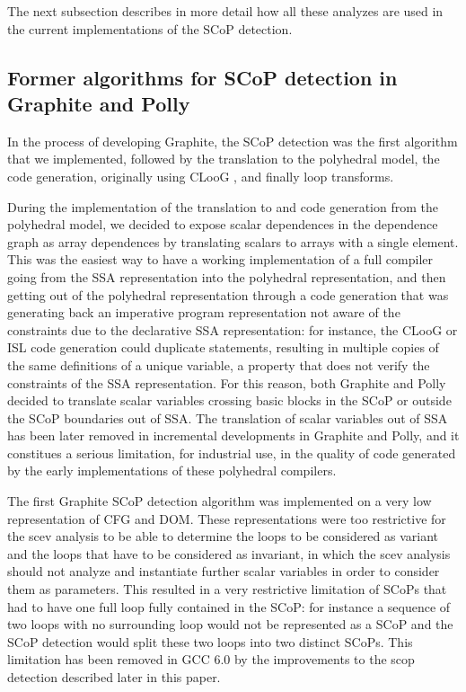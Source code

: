 \documentclass{sigplanconf}
\begin{document}
The next subsection describes in more detail how all these analyzes are used in
the current implementations of the SCoP detection.

\subsection{Former algorithms for SCoP detection in Graphite and Polly}

In the process of developing Graphite, the SCoP detection was the first
algorithm that we implemented, followed by the translation to the polyhedral
model, the code generation, originally using CLooG \cite{cloog}, and finally
loop transforms.

During the implementation of the translation to and code generation from the
polyhedral model, we decided to expose scalar dependences in the dependence
graph as array dependences by translating scalars to arrays with a single
element.  This was the easiest way to have a working implementation of a full
compiler going from the SSA representation into the polyhedral representation,
and then getting out of the polyhedral representation through a code generation
that was generating back an imperative program representation not aware of the
constraints due to the declarative SSA representation: for instance, the CLooG
or ISL code generation could duplicate statements, resulting in multiple copies
of the same definitions of a unique variable, a property that does not verify
the constraints of the SSA representation.  For this reason, both Graphite and
Polly decided to translate scalar variables crossing basic blocks in the SCoP or
outside the SCoP boundaries out of SSA.  The translation of scalar variables out
of SSA has been later removed in incremental developments in Graphite and Polly,
and it constitues a serious limitation, for industrial use, in the quality of
code generated by the early implementations of these polyhedral compilers.

The first Graphite SCoP detection algorithm was implemented on a very low
representation of CFG and DOM.  These representations were too restrictive for
the scev analysis to be able to determine the loops to be considered as variant
and the loops that have to be considered as invariant, in which the scev
analysis should not analyze and instantiate further scalar variables in order to
consider them as parameters.  This resulted in a very restrictive limitation of
SCoPs that had to have one full loop fully contained in the SCoP: for instance a
sequence of two loops with no surrounding loop would not be represented as a
SCoP and the SCoP detection would split these two loops into two distinct SCoPs.
This limitation has been removed in GCC 6.0 by the improvements to the scop
detection described later in this paper.
\end{document}
